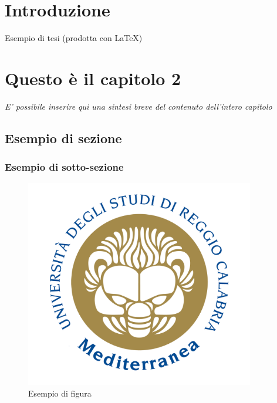 \documentclass[envcountsame,envcountchap]{svmono}
\begin{document}
\newpage


\tableofcontents

\listoffigures



\mainmatter%

 \setcounter{page}{1}

\chapter{Introduzione} \label{introduzione}

Esempio di tesi (prodotta con \LaTeX)

\vspace{2cm}

\Blindtext[3]





\chapter{Questo è il capitolo 2} \label{cap2}
\begin{flushright}
\textit{E' possibile inserire qui una sintesi breve del contenuto dell'intero capitolo}
\end{flushright}
\medskip


\Blindtext[3]






\section{Esempio di sezione}\label{sec:analisi_requisiti}
\Blindtext[3]

\subsection{Esempio di sotto-sezione}\label{sec:diagrammi}


\begin{figure}[t]
\centerline{\includegraphics[width=10cm]{logounirc.png}}
\caption{Esempio di figura}\label{fig:progetto}
\end{figure}
\end{document}
